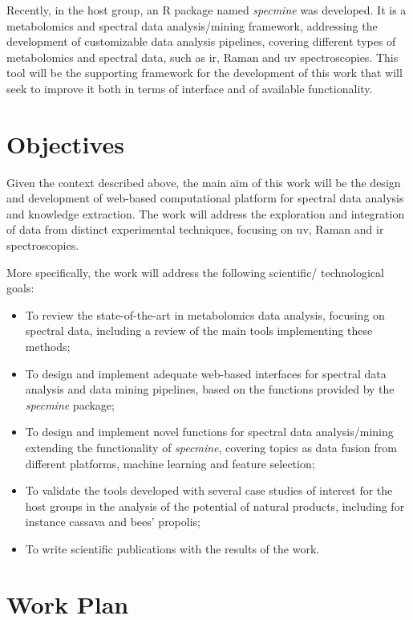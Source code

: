 Recently, in the host group, an R package named \textit{specmine} \citep{costa2016r} was developed. It is a metabolomics and spectral data analysis/mining framework, addressing the development of customizable data analysis pipelines, covering different types of metabolomics and spectral data, such as \gls{ir}, Raman and \gls{uv} spectroscopies. This tool will be the supporting framework for the development of this work that will seek to improve it both in terms of interface and of available functionality.


\section{Objectives}

Given the context described above, the main aim of this work will be the design and development of web-based computational platform for spectral data analysis and knowledge extraction. The work will address the exploration and integration of data from distinct experimental techniques, focusing on \gls{uv}, Raman and \gls{ir} spectroscopies. 

More specifically, the work will address the following scientific/ technological goals:

\begin{itemize}
	\item To review the state-of-the-art in metabolomics data analysis, focusing on spectral data, including a review of the main tools implementing these methods;
	\item To design and implement adequate web-based interfaces for spectral data analysis and data mining pipelines, based on the functions provided by the \textit{specmine} package;
	\item To design and implement novel functions for spectral data analysis/mining extending the functionality of \textit{specmine}, covering topics as data fusion from different platforms, machine learning and feature selection;
	\item To validate the tools developed with several case studies of interest for the host groups in the analysis of the potential of natural products, including for instance cassava and bees’ propolis;
	\item To write scientific publications with the results of the work.
\end{itemize}


\section{Work Plan}


